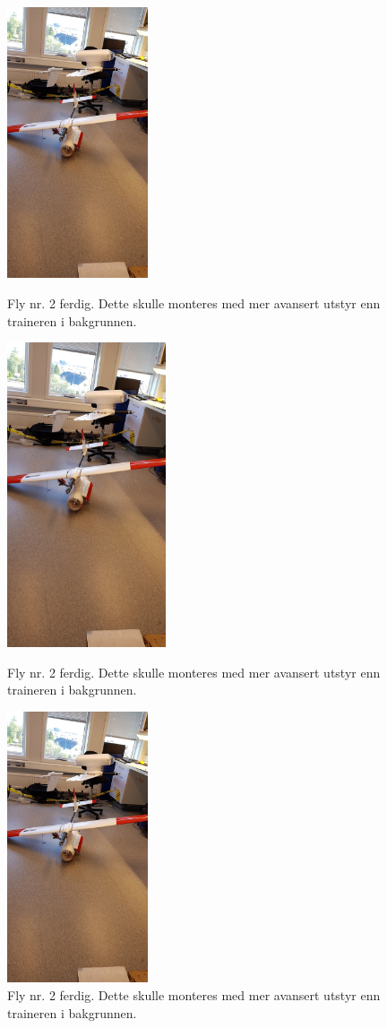 \documentclass[12pt, a4paper]{article}
\begin{document}
\begin{figure}[h]
	\centering

	\includegraphics[width = .6\textwidth, height = 8cm]{bilder/andre_fly_ferdigstilt.jpg}
	\caption[Fly nummer to ferdig]{Fly nr. 2 ferdig. Dette skulle monteres med mer avansert utstyr enn traineren i bakgrunnen.}

	\includegraphics[width = .45\textwidth, height = 9cm]{bilder/andre_fly_ferdigstilt.jpg}
	\caption{Fly nr. 2 ferdig. Dette skulle monteres med mer avansert utstyr enn traineren i bakgrunnen.}

	\includegraphics[width = .6\textwidth, height = 8cm]{bilder/andre_fly_ferdigstilt.jpg}
	\caption[Fly nummer to ferdig]{Fly nr. 2 ferdig. Dette skulle monteres med mer avansert utstyr enn traineren i bakgrunnen.}

\end{figure}
\end{document}
